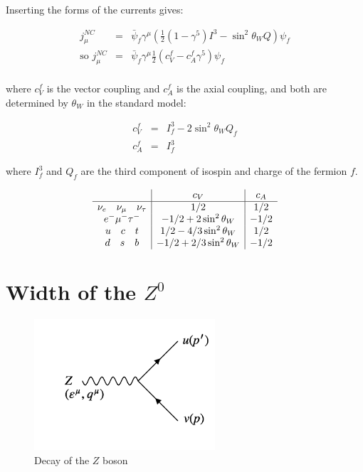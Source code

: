 Inserting the forms of the currents gives:

\begin{eqnarray*}
  j^{NC}_{\mu} & = & \bar{\psi}_f \gamma^{\mu}\left( \frac{1}{2}\left(1 - \gamma^5\right)I^3 - \sin^2\theta_W Q\right) \psi_f \\
  \textrm{so } j^{NC}_{\mu} & = & \bar{\psi}_f \gamma^{\mu}\frac{1}{2}\left(c^f_V - c^f_A \gamma^5\right)\psi_f \\
\end{eqnarray*}

where $c^f_V$ is the vector coupling and $c^f_A$ is the axial coupling, and both are determined by $\theta_W$ in the standard model:

\begin{eqnarray*}
  c^f_V & = & I^3_f - 2 \sin^2\theta_W Q_f \\
  c^f_A & = & I^3_f
\end{eqnarray*}

where $I^3_f$ and $Q_f$ are the third component of isospin and charge of the fermion $f$.

\[
  \begin{array}{c|c|c}
                                            & c_V                      & c_A  \\
  \hline
  \nu_{e} \quad \nu_{\mu} \quad \nu_{\tau} & 1/2                      &  1/2 \\
  e^- \mu^- \tau^-                         & -1/2 + 2\sin^2\theta_W   & -1/2 \\
  u \quad c \quad t                         & 1/2  - 4/3\sin^2\theta_W &  1/2 \\
  d \quad s \quad b                         & -1/2 + 2/3\sin^2\theta_W & -1/2
  \end{array}
\]

\section{Width of the \texorpdfstring{$Z^0$}{Z0}}

\begin{figure}[!htb]
  \begin{center}
    \includegraphics[width=0.6\textwidth]{images/web_feynman/image_57.png}
    \caption[Decay of $Z$ boson]{Decay of the $Z$ boson}
    \label{fig:ch13_ZToFF}
  \end{center}
\end{figure}

